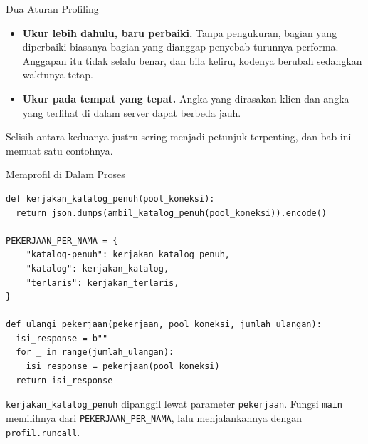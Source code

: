 \documentclass[aspectratio=169, table, 12pt]{beamer}
\begin{document}
\begin{frame}{{\Large Dua Aturan Profiling}}
  \vspace{14pt}
  \begin{itemize}
    \item \textbf{Ukur lebih dahulu, baru perbaiki.} Tanpa pengukuran,
          bagian yang diperbaiki biasanya bagian yang dianggap penyebab
          turunnya performa. Anggapan itu tidak selalu benar, dan bila
          keliru, kodenya berubah sedangkan waktunya tetap.
    \item \textbf{Ukur pada tempat yang tepat.} Angka yang dirasakan klien
          dan angka yang terlihat di dalam server dapat berbeda jauh.
  \end{itemize}
  \vspace{10pt}
  {\footnotesize Selisih antara keduanya justru sering menjadi petunjuk
  terpenting, dan bab ini memuat satu contohnya.}
\end{frame}

\begin{frame}[fragile]{{\Large Memprofil di Dalam Proses}}
  \vspace{2pt}
\begin{lstlisting}[style=PythonStyle]
def kerjakan_katalog_penuh(pool_koneksi):
  return json.dumps(ambil_katalog_penuh(pool_koneksi)).encode()

PEKERJAAN_PER_NAMA = {
    "katalog-penuh": kerjakan_katalog_penuh,
    "katalog": kerjakan_katalog,
    "terlaris": kerjakan_terlaris,
}

def ulangi_pekerjaan(pekerjaan, pool_koneksi, jumlah_ulangan):
  isi_response = b""
  for _ in range(jumlah_ulangan):
    isi_response = pekerjaan(pool_koneksi)
  return isi_response
\end{lstlisting}
  \vspace{2pt}
  {\footnotesize \texttt{kerjakan\_katalog\_penuh} dipanggil lewat parameter
  \texttt{pekerjaan}. Fungsi \texttt{main} memilihnya dari
  \texttt{PEKERJAAN\_PER\_NAMA}, lalu menjalankannya dengan
  \texttt{profil.runcall}.}
\end{frame}
\end{document}
